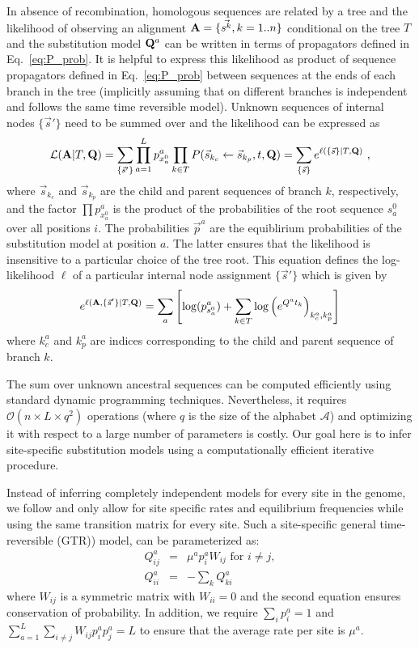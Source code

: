 \documentclass[aps,rmp,twocolumn]{revtex4}
\newcommand{\mat}[1]{{\bf #1}}
\newcommand{\abet}{\mathcal{A}}
\newcommand{\eqp}{p}
\newcommand{\LH}{\mathcal{L}}
\newcommand{\lh}{\ell}
\begin{document}
In absence of recombination, homologous sequences are related by a tree and the likelihood of observing an alignment $\mat{A}=\{\vec{s^k}, k=1..n\}$ conditional on the tree $T$ and the substitution model $\mat{Q}^{a}$ can be written in terms of propagators defined in Eq.~\ref{eq:P_prob}.
It is helpful to express this likelihood as product of sequence propagators defined in Eq.~\ref{eq:P_prob} between sequences at the ends of each branch in the tree (implicitly assuming that on different branches is independent and follows the same time reversible model).
Unknown sequences of internal nodes $\{\vec{s}'\}$ need to be summed over and the likelihood can be expressed as
\begin{equation}
	\LH(\mat{A}|T,\mat{Q}) = \sum_{\{\vec{s}'\}}\prod_{a=1}^L \eqp^{a}_{x^{0}_a} \prod_{k\in T}P(\vec{s}_{k_c}\leftarrow \vec{s}_{k_p},t,\mat{Q}) = \sum_{\{\vec{s}\}} e^{\lh(\{\vec{s}\} |T, \mat{Q})}  \ ,
	\label{eq:LH}
\end{equation}
where $\vec{s}_{k_c}$ and $\vec{s}_{k_p}$ are the child and parent sequences of branch $k$, respectively, and the factor $\prod \eqp^{a}_{x^{0}_a}$ is the product of the probabilities of the root sequence $s^{0}_a$ over all positions $i$.
The probabilities $\vec{\eqp}^{a}$ are the equiblirium probabilities of the substitution model at position $a$.
The latter ensures that the likelihood is insensitive to a particular choice of the tree root.
This equation defines the log-likelihood $\lh$ of a particular internal node assignment $\{\vec{s}'\}$ which is given by
\begin{equation}
	e^{\lh(\mat{A}, \{\vec{s}'\} |T, \mat{Q})} = \sum_a \left[\log(\eqp^a_{s^{0}_a}) + \sum_{k\in T} \log\left( e^{Q^at_k} \right)_{k^a_c, k^a_p}\right]
\end{equation}
where $k^a_c$ and $k^a_p$ are indices corresponding to the child and parent sequence of branch $k$.

The sum over unknown ancestral sequences can be computed efficiently using standard dynamic programming techniques.
Nevertheless, it requires $\mathcal{O}(n\times L \times q^2)$ operations (where $q$ is the size of the alphabet $\abet$) and optimizing it with respect to a large number of parameters is costly.
Our goal here is to infer site-specific substitution models using a computationally efficient iterative procedure.

Instead of inferring completely independent models for every site in the genome, we follow \citet{halpern_evolutionary_1998} and only allow for site specific rates and equilibrium frequencies while using the same transition matrix for every site.
Such a site-specific general time-reversible (GTR)) model, can be parameterized as:
\begin{eqnarray}
Q^{a}_{ij} &=& \mu^{a}\eqp^{a}_{i} W_{ij} \textrm{ for } i\neq j,\nonumber \\
Q^{a}_{ii} &=& -\sum_k Q^{a}_{ki}
\label{eq:Qij}
\end{eqnarray}
where $W_{ij}$ is a symmetric matrix with $W_{ii}=0$ and the second equation ensures conservation of probability.
In addition, we require $\sum_i \eqp^{a}_i = 1$ and $\sum_{a=1}^L\sum_{i\neq j}W_{ij}p^{a}_ip^{a}_j=L$ to ensure that the average rate per site is $\mu^{a}$.
\end{document}
